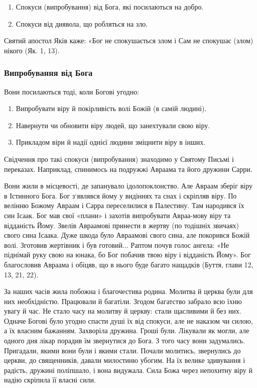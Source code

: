 \documentclass[main.tex]{subfiles}
\begin{document}
\begin{enumerate}
    \item Спокуси (випробування) від Бога, які посилаються на добро.
    \item Спокуси від диявола, що робляться на зло.
\end{enumerate}

Святий апостол Яків каже: «Бог не спокушається злом і Сам не спокушає (злом) нікого (Як. 1, 13).

\subsubsection{Випробування від Бога}

Вони посилаються тоді, коли Богові угодно:

\begin{enumerate}
    \item Випробувати віру й покірливість волі Божій (в самій людині).
    \item Навернути чи обновити віру людей, що занехтували свою віру.
    \item Прикладом віри й надії однієї людини зміцнити віру в інших.
\end{enumerate} 

Свідчення про такі спокуси (випробування) знаходимо у Святому Письмі і переказах. Наприклад, спинимось на подружжі Авраама та його дружини Сарри.

Вони жили в місцевості, де запанувало ідолопоклонство. Але Авраам зберіг віру в Істинного Бога. Бог з`являвся йому у видіннях та снах і скріпляв віру. По велінню Божому Авраам і Сарра переселилися в Палестину. Там народився їх син Ісаак. Бог мав свої «плани» і захотів випробувати Авраа-мову віру та відданість Йому. Звелів Авраамові принести в жертву (по тодішніх звичаях) свого сина Ісаака. Дуже шкода було Авраамові свого сина, але покорився Божій волі. Зготовив жертівник і був готовий... Раптом почув голос ангела: «Не піднімай руку свою на юнака, бо Бог побачив твою віру і відданість Йому». Бог благословив Авраама і обіцяв, що в нього буде багато нащадків (Буття, глави 12, 13, 21, 22).

За наших часів жила побожна і благочестива родина. Молитва й церква були для них необхідністю. Працювали й багатіли. Згодом багатство забрало всю їхню увагу й час. Не стало часу на молитву й церкву: стали щасливими й без них. Одначе Богові було угодно спасти душі їх від спокуси, але не наказом чи силою, а їх власним бажанням. Захворіла дружина. Гроші були. Лікували як могли, але одного дня лікар порадив їм звернутися до Бога. З того часу вони задумались. Пригадали, якими вони були і якими стали. Почали молитись, звернулись до церкви, до священників, давали милостиню убогим. На їх велике здивування і радість, дружині поліпшало, і вона видужала. Сила Божа через непохитну віру й надію скріпила її власні сили.
\end{document}
